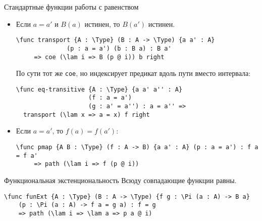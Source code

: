 \documentclass[aspectratio=169,dvipsnames,usenames]{beamer}
\begin{document}
\begin{frame}[fragile]{Стандартные функции работы с равенством}
\begin{itemize}
\item Если $a = a'$ и $B(a)$ истинен, то $B(a')$ истинен.

\small\color[HTML]{025002}\begin{verbatim}\func transport {A : \Type} (B : A -> \Type) {a a' : A} 
              (p : a = a') (b : B a) : B a'
     => coe (\lam i => B (p @ i)) b right\end{verbatim}
\normalsize\color{black}

По сути тот же \verb!coe!, но индексирует предикат вдоль пути вместо интервала:

\small\color[HTML]{025002}\begin{verbatim}\func eq-transitive {A : \Type} {a a' a'' : A}
                    (f : a = a')
                    (g : a' = a'') : a = a'' =>
  transport (\lam x => a = x) f right
\end{verbatim}\normalsize
\color{black}

\item Если $a = a'$, то $f(a) = f(a')$:

\small\color[HTML]{025002}\begin{verbatim}
\func pmap {A B : \Type} (f : A -> B) {a a' : A} (p : a = a') : f a = f a' 
     => path (\lam i => f (p @ i))
\end{verbatim}\normalsize
\color{black}
\end{itemize}

\end{frame}

\begin{frame}[fragile]{Функциональная экстенциональность}
Всюду совпадающие функции равны.

\small\color[HTML]{025002}\begin{verbatim}\func funExt {A : \Type} (B : A -> \Type) {f g : \Pi (a : A) -> B a}
    (p : \Pi (a : A) -> f a = g a) : f = g
    => path (\lam i => \lam a => p a @ i)\end{verbatim}
\normalsize
\color{black}
\end{frame}
\end{document}
